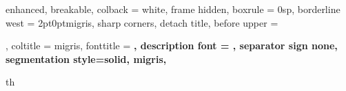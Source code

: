
{%
    enhanced,
    breakable,
    colback = white,
    frame hidden,
    boxrule = 0sp,
    borderline west = {2pt}{0pt}{migris},
    sharp corners,
    detach title,
    before upper = \tcbtitle\par\smallskip,
    coltitle = migris,
    fonttitle = \bfseries\sffamily,
    description font = \mdseries,
    separator sign none,
    segmentation style={solid, migris},
}
{th}

\newcommand{\teorema}[2]{\begin{Teorema}{#1}{}#2\end{Teorema}}
\newcommand{\corolario}[2]{\begin{Corolario}{#1}{}#2\end{Corolario}}
\newcommand{\lema}[2]{\begin{Lema}{#1}{}#2\end{Lema}}
\newcommand{\preposicion}[2]{\begin{Prepo}{#1}{}#2\end{Prepo}}
\newcommand{\nota}[2]{\begin{Nota}{#1}{}#2\end{Nota}}
\newcommand{\dfe}[2]{\begin{defi}{#1}{}#2\end{defi}}
\newcommand{\demostracion}[1]{\begin{proof}[\color{primary}\textbf{Demostración.}] #1 \end{proof}}

\theoremstyle{definition}
\newtheorem*{ejem}{\color{primary}Ejemplo}
\newcommand{\ejemplo}[1]{\begin{ejem}#1\end{ejem}}

\theoremstyle{definition}
\newtheorem*{solu}{\color{primary}Solución}
\newcommand{\solucion}[1]{\begin{solu}#1\end{solu}}

\usepackage{tikz}

\usepackage{enumitem}

\newcommand{\cnumero}[2]{
    \tikz[baseline=(myanchor.base)]
    \node[minimum size=0.2cm,circle,
        inner sep=1pt,draw, #2,thick,fill=#2](myanchor)
    {\color{white}\bfseries\fontsize{8}{8}#1};}

